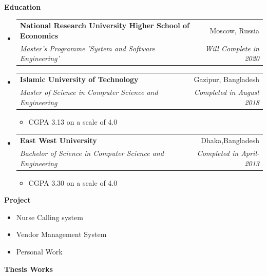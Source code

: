 \documentclass[letterpaper,10pt]{article}
\makeatletter
\newcommand{\resitem}[1]{\item #1 \vspace{-2pt}}
\newcommand{\resheading}[1]{{\large \colorbox{mygrey}{\begin{minipage}{\textwidth}{\textbf{#1 \vphantom{p\^{E}}}}\end{minipage}}}}
\newcommand{\ressubheading}[4]{
\begin{tabular*}{6.5in}{l@{\extracolsep{\fill}}r}
		\textbf{#1} & #2 \\
		\textit{#3} & \textit{#4} \\
\end{tabular*}\vspace{-6pt}}
\makeatother
\begin{document}
\resheading{Education}
\begin{itemize}
\item
	\ressubheading{National Research University Higher School of Economics}{Moscow, Russia}{Master’s Programme 'System and Software Engineering'}{Will Complete in 2020}


\item
	\ressubheading{Islamic University of Technology}{Gazipur, Bangladesh}{Master of Science in Computer Science and Engineering }{Completed in August 2018}
\begin{itemize}

		\item  CGPA 3.13  on a scale of 4.0

	\end{itemize}
	
\item
	\ressubheading{East West University}{Dhaka,Bangladesh}{Bachelor of Science in Computer Science and Engineering}{Completed in April-2013}
	\begin{itemize}
		\item  CGPA 3.30 on a scale of 4.0

	\end{itemize}


\end{itemize}

\resheading{Project}

\begin{itemize}
\resitem{Nurse Calling system}
\resitem{Vendor Management System}
\resitem{Personal Work}
\end{itemize}

\resheading{Thesis Works}
\end{document}
